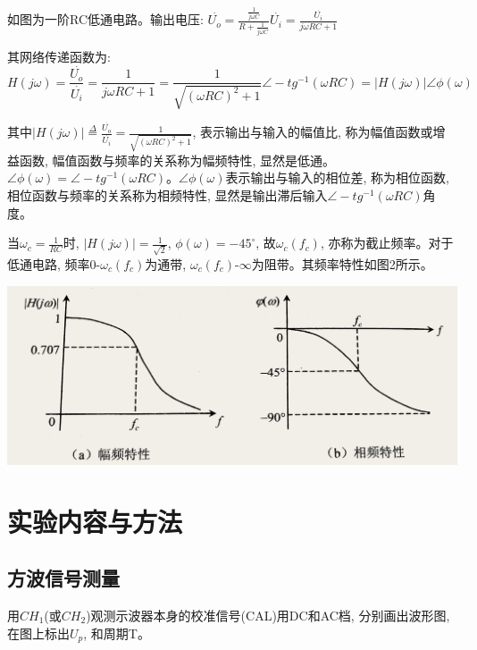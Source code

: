 \documentclass[a4paper]{article}
\begin{document}
    \hspace{3.5cm}{\small 图一}

    {如图为一阶RC低通电路。输出电压: $\stackrel{\cdot}{U_{o}}=\frac{\frac{1}{j \omega C}}{R+\frac{1}{j \omega C}}\stackrel{\cdot}{U_{i}}=\frac{\stackrel{\cdot}{U_{i}}}{j \omega R C+1}$}

    {其网络传递函数为: \[H(j \omega)=\frac{\stackrel{\cdot}{U_{o}}}{\stackrel{\cdot}{U_{i}}}=\frac{1}{j \omega R C+1}=\frac{1}{\sqrt{(\omega R C)^{2}+1}} \angle -tg^{-1}(\omega RC)=|H(j \omega)|\angle \phi(\omega)\]}

    {其中$|H(j \omega)|\stackrel{\Delta}{=}\frac{\stackrel{\cdot}{U_{o}}}{\stackrel{\cdot}{U_{i}}}=\frac{1}{\sqrt{(\omega R C)^{2}+1}}$, 表示输出与输入的幅值比, 称为幅值函数或增益函数, 幅值函数与频率的关系称为幅频特性, 显然是低通。$\angle \phi(\omega)=\angle -tg^{-1}(\omega RC)$。$\angle \phi(\omega)$表示输出与输入的相位差, 称为相位函数, 相位函数与频率的关系称为相频特性, 显然是输出滞后输入$\angle -tg^{-1}(\omega RC)$角度。}

    {当$\omega _{c}=\frac{1}{RC}$时, $|H(j \omega)|=\frac{1}{\sqrt{2}}$, $\phi (\omega)=-45^{\circ}$, 故$\omega _{c}(f_{c})$, 亦称为截止频率。对于低通电路, 频率0-$\omega _{c}(f_{c})$为通带, $\omega _{c}(f_{c})$-$\infty$为阻带。其频率特性如图2所示。}

    \includegraphics[height=0.22\textheight]{2}

    \hspace{5.3cm}{\small 图二}


    \section{实验内容与方法}\label{sec:3}
    \subsection{方波信号测量}

    {用$CH_{1}$(或$CH_{2}$)观测示波器本身的校准信号(CAL)用DC和AC档, 分别画出波形图, 在图上标出$U_{p}$, 和周期T。}\label{subsec:2}
\end{document}
